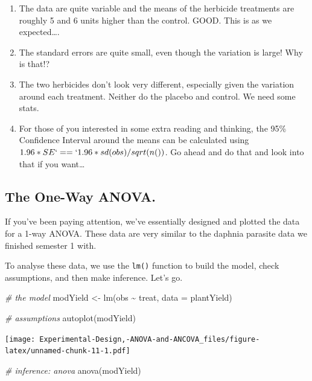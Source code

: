 \documentclass[
]{book}
\newenvironment{Shaded}{\begin{snugshade}}{\end{snugshade}}
\newcommand{\AttributeTok}[1]{\textcolor[rgb]{0.77,0.63,0.00}{#1}}
\newcommand{\CommentTok}[1]{\textcolor[rgb]{0.56,0.35,0.01}{\textit{#1}}}
\newcommand{\FunctionTok}[1]{\textcolor[rgb]{0.00,0.00,0.00}{#1}}
\newcommand{\NormalTok}[1]{#1}
\newcommand{\OtherTok}[1]{\textcolor[rgb]{0.56,0.35,0.01}{#1}}
\newcommand{\SpecialCharTok}[1]{\textcolor[rgb]{0.00,0.00,0.00}{#1}}
\providecommand{\tightlist}{%
  \setlength{\itemsep}{0pt}\setlength{\parskip}{0pt}}
\begin{document}
\begin{enumerate}
\def\labelenumi{\arabic{enumi}.}
\tightlist
\item
  The data are quite variable and the means of the herbicide treatments are roughly 5 and 6 units higher than the control. GOOD. This is as we expected\ldots.
\item
  The standard errors are quite small, even though the variation is large! Why is that!?
\item
  The two herbicides don't look very different, especially given the variation around each treatment. Neither do the placebo and control. We need some stats.
\item
  For those of you interested in some extra reading and thinking, the 95\% Confidence Interval around the means can be calculated using \(1.96*SE` == `1.96*sd(obs)/sqrt(n())\). Go ahead and do that and look into that if you want\ldots{}
\end{enumerate}

\hypertarget{the-one-way-anova.}{%
\subsection{The One-Way ANOVA.}\label{the-one-way-anova.}}

If you've been paying attention, we've essentially designed and plotted the data for a 1-way ANOVA. These data are very similar to the daphnia parasite data we finished semester 1 with.

To analyse these data, we use the \texttt{lm()} function to build the model, check assumptions, and then make inference. Let's go.

\begin{Shaded}
\begin{Highlighting}[]
\CommentTok{\# the model}
\NormalTok{modYield }\OtherTok{\textless{}{-}} \FunctionTok{lm}\NormalTok{(obs }\SpecialCharTok{\textasciitilde{}}\NormalTok{ treat, }\AttributeTok{data =}\NormalTok{ plantYield)}

\CommentTok{\# assumptions}
\FunctionTok{autoplot}\NormalTok{(modYield)}
\end{Highlighting}
\end{Shaded}

\texttt{[image: Experimental-Design,-ANOVA-and-ANCOVA\_files/figure-latex/unnamed-chunk-11-1.pdf]}

\begin{Shaded}
\begin{Highlighting}[]
\CommentTok{\# inference: anova}
\FunctionTok{anova}\NormalTok{(modYield)}
\end{Highlighting}
\end{Shaded}
\end{document}
